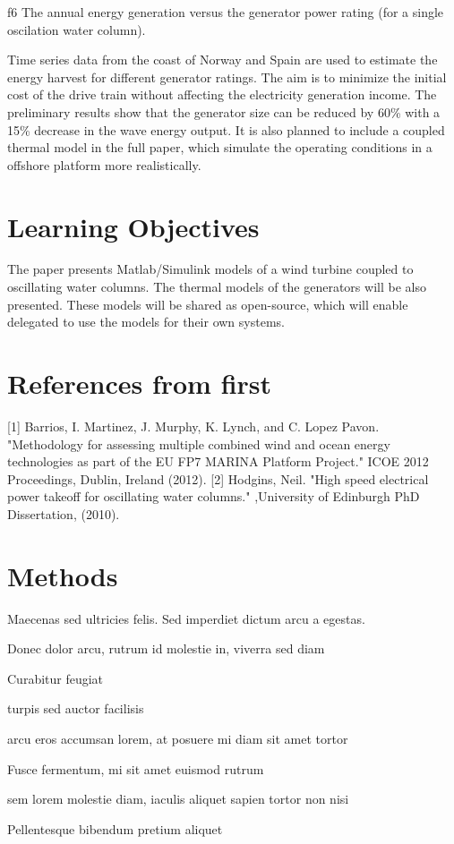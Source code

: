 \documentclass[twocolumn]{article}
\begin{document}
{f6} The annual energy generation versus the generator power rating (for a single oscilation water column).

Time series data from the coast of Norway and Spain are used to estimate the energy harvest for different generator ratings. The aim is to minimize the initial cost of the drive train without affecting the electricity generation income. The preliminary results show that the generator size can be reduced by 60\% with a 15\% decrease in the wave energy output. It is also planned to include a coupled thermal model in the full paper, which simulate the operating conditions in a offshore platform more realistically.


\section{Learning Objectives} %
\label{sec:learning_objectives}

The paper presents Matlab/Simulink models of a wind turbine coupled to oscillating water columns. The thermal models of the generators will be also presented. These models will be shared as open-source, which will enable delegated to use the models for their own systems.


\section{References from first} %
\label{sec:references_from_first}
[1] Barrios, I. Martinez, J. Murphy, K. Lynch, and C. Lopez Pavon. "Methodology for assessing multiple combined wind and ocean energy technologies as part of the EU FP7 MARINA Platform Project." ICOE 2012 Proceedings, Dublin, Ireland (2012).
[2] Hodgins, Neil. "High speed electrical power takeoff for oscillating water columns." ,University of Edinburgh PhD Dissertation, (2010).


\section{Methods}

Maecenas sed ultricies felis. Sed imperdiet dictum arcu a egestas. 
\begin{compactitem}
\item Donec dolor arcu, rutrum id molestie in, viverra sed diam
\item Curabitur feugiat
\item turpis sed auctor facilisis
\item arcu eros accumsan lorem, at posuere mi diam sit amet tortor
\item Fusce fermentum, mi sit amet euismod rutrum
\item sem lorem molestie diam, iaculis aliquet sapien tortor non nisi
\item Pellentesque bibendum pretium aliquet
\end{compactitem}
\lipsum[4] %
\end{document}
